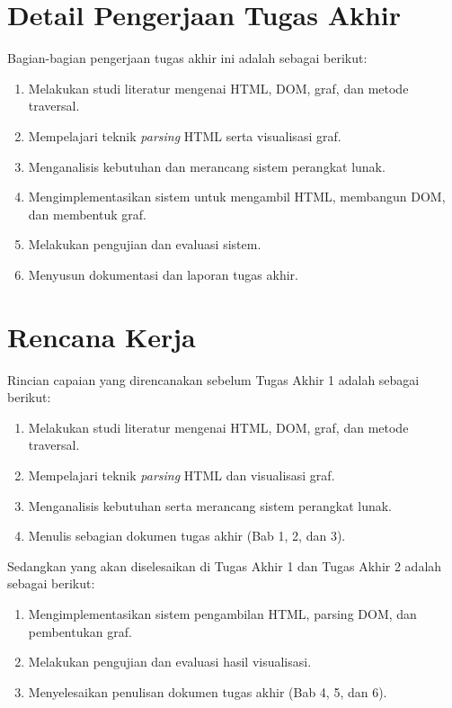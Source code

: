 \documentclass[a4paper,twoside]{article}
\begin{document}
	\section{Detail Pengerjaan Tugas Akhir}
	Bagian-bagian pengerjaan tugas akhir ini adalah sebagai berikut:
    \begin{enumerate}
        \item Melakukan studi literatur mengenai HTML, DOM, graf, dan metode traversal.
        \item Mempelajari teknik \textit{parsing} HTML serta visualisasi graf.
        \item Menganalisis kebutuhan dan merancang sistem perangkat lunak.
        \item Mengimplementasikan sistem untuk mengambil HTML, membangun DOM, dan membentuk graf.
        \item Melakukan pengujian dan evaluasi sistem.
        \item Menyusun dokumentasi dan laporan tugas akhir.
    \end{enumerate}
	
	\section{Rencana Kerja}
	Rincian capaian yang direncanakan sebelum Tugas Akhir 1 adalah sebagai berikut:
    \begin{enumerate}
        \item Melakukan studi literatur mengenai HTML, DOM, graf, dan metode traversal.
        \item Mempelajari teknik \textit{parsing} HTML dan visualisasi graf.
        \item Menganalisis kebutuhan serta merancang sistem perangkat lunak.
        \item Menulis sebagian dokumen tugas akhir (Bab 1, 2, dan 3).
    \end{enumerate}
    
    Sedangkan yang akan diselesaikan di Tugas Akhir 1 dan Tugas Akhir 2 adalah sebagai berikut:
    \begin{enumerate}
        \item Mengimplementasikan sistem pengambilan HTML, parsing DOM, dan pembentukan graf.
        \item Melakukan pengujian dan evaluasi hasil visualisasi.
        \item Menyelesaikan penulisan dokumen tugas akhir (Bab 4, 5, dan 6).
    \end{enumerate}
	
\end{document}
